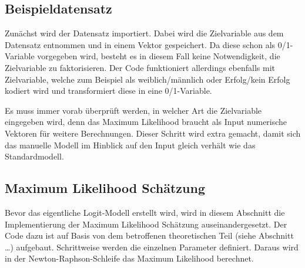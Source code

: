 \documentclass[12pt,]{article}
\newenvironment{Shaded}{\begin{snugshade}}{\end{snugshade}}
\newcommand{\KeywordTok}[1]{\textcolor[rgb]{0.13,0.29,0.53}{\textbf{#1}}}
\newcommand{\DataTypeTok}[1]{\textcolor[rgb]{0.13,0.29,0.53}{#1}}
\newcommand{\DecValTok}[1]{\textcolor[rgb]{0.00,0.00,0.81}{#1}}
\newcommand{\StringTok}[1]{\textcolor[rgb]{0.31,0.60,0.02}{#1}}
\newcommand{\CommentTok}[1]{\textcolor[rgb]{0.56,0.35,0.01}{\textit{#1}}}
\newcommand{\ControlFlowTok}[1]{\textcolor[rgb]{0.13,0.29,0.53}{\textbf{#1}}}
\newcommand{\OperatorTok}[1]{\textcolor[rgb]{0.81,0.36,0.00}{\textbf{#1}}}
\newcommand{\NormalTok}[1]{#1}
\begin{document}
\subsection{Beispieldatensatz}\label{beispieldatensatz}

Zunächst wird der Datensatz importiert. Dabei wird die Zielvariable aus
dem Datensatz entnommen und in einem Vektor gespeichert. Da diese schon
als 0/1-Variable vorgegeben wird, besteht es in diesem Fall keine
Notwendigkeit, die Zielvariable zu faktorisieren. Der Code funktioniert
allerdings ebenfalls mit Zielvariable, welche zum Beispiel als
weiblich/männlich oder Erfolg/kein Erfolg kodiert wird und transformiert
diese in eine 0/1-Variable.

\begin{Shaded}
\end{Shaded}

Es muss immer vorab überprüft werden, in welcher Art die Zielvariable
eingegeben wird, denn das Maximum Likelihood braucht als Input
numerische Vektoren für weitere Berechnungen. Dieser Schritt wird extra
gemacht, damit sich das manuelle Modell im Hinblick auf den Input gleich
verhält wie das Standardmodell.

\subsection{Maximum Likelihood
Schätzung}\label{maximum-likelihood-schatzung-1}

Bevor das eigentliche Logit-Modell erstellt wird, wird in diesem
Abschnitt die Implementierung der Maximum Likelihood Schätzung
auseinandergesetzt. Der Code dazu ist auf Basis von dem betroffenen
theoretischen Teil (siehe Abschnitt \ldots{}) aufgebaut. Schrittweise
werden die einzelnen Parameter definiert. Daraus wird in der
Newton-Raphson-Schleife das Maximum Likelihood berechnet.
\end{document}
